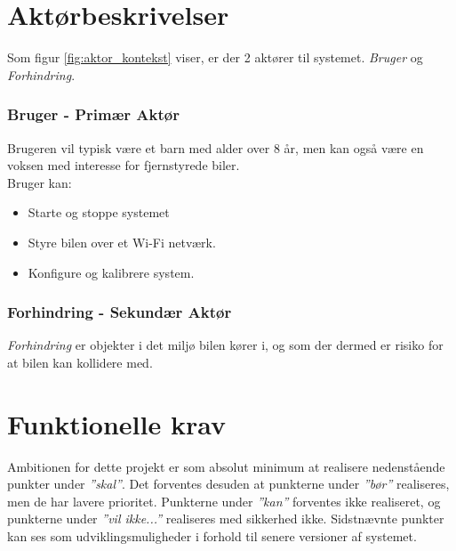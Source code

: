 
\section{Aktørbeskrivelser} \label{sec:aktorbeskrivelser}
Som figur \ref{fig:aktor_kontekst} viser, er der 2 aktører til systemet.
\textit{Bruger} og \textit{Forhindring}.

\subsubsection{Bruger - Primær Aktør}
Brugeren vil typisk være et barn med alder over 8 år, men kan også være en voksen med interesse for fjernstyrede biler.
\\ %
Bruger kan:
\begin{itemize}
	\item Starte og stoppe systemet 
	\item Styre bilen over et Wi-Fi netværk.
	\item Konfigure og kalibrere system.
\end{itemize}

\subsubsection{Forhindring - Sekundær Aktør}
\textit{Forhindring} er objekter i det miljø bilen kører i, og som der dermed er risiko for at bilen kan kollidere med.  
\clearpage


\clearpage

\section{Funktionelle krav} \label{sec:funktionelle_krav}
Ambitionen for dette projekt er som absolut minimum at realisere nedenstående punkter under \textit{''skal''}. 
Det forventes desuden at punkterne under \textit{''bør''} realiseres, men de har lavere prioritet.
Punkterne under \textit{''kan''} forventes ikke realiseret, og punkterne under \textit{''vil ikke...''} realiseres med sikkerhed ikke. 
Sidstnævnte punkter kan ses som udviklingsmuligheder i forhold til senere versioner af systemet. 

